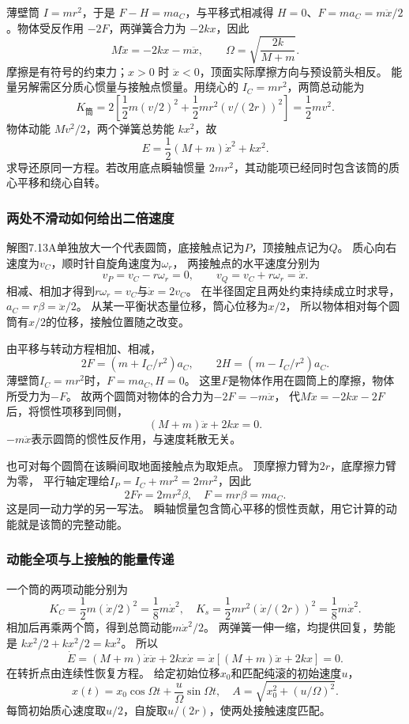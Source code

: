\documentclass[UTF8,fontset=fandol,a4paper,11pt]{ctexart}
\begin{document}
薄壁筒 $I=mr^2$，于是 $F-H=ma_C$，与平移式相减得 $H=0$、$F=ma_C=m\ddot x/2$。物体受反作用 $-2F$，两弹簧合力为 $-2kx$，因此
\[M\ddot x=-2kx-m\ddot x,\qquad
\boxed{\Omega=\sqrt{\frac{2k}{M+m}}.}\]
摩擦是有符号的约束力；$x>0$ 时 $\ddot x<0$，顶面实际摩擦方向与预设箭头相反。
能量另解需区分质心惯量与接触点惯量。用绕心的 $I_C=mr^2$，两筒总动能为
\[K_{
\text{筒}}=2\left[\frac12m(v/2)^2+\frac12mr^2(v/(2r))^2\right]
=\frac12mv^2.\]
物体动能 $Mv^2/2$，两个弹簧总势能 $kx^2$，故
\[E=\frac12(M+m)\dot x^2+kx^2.\]
求导还原同一方程。若改用底点瞬轴惯量 $2mr^2$，其动能项已经同时包含该筒的质心平移和绕心自转。
\subsubsection*{两处不滑动如何给出二倍速度}
解图7.13A单独放大一个代表圆筒，底接触点记为$P$，顶接触点记为$Q$。
质心向右速度为$v_C$，顺时针自旋角速度为$\omega_r$，
两接触点的水平速度分别为
\[
v_P=v_C-r\omega_r=0,\qquad
v_Q=v_C+r\omega_r=\dot x.
\]
相减、相加才得到$r\omega_r=v_C$与$\dot x=2v_C$。
在半径固定且两处约束持续成立时求导，
$a_C=r\beta=\ddot x/2$。
从某一平衡状态量位移，筒心位移为$x/2$，
所以物体相对每个圆筒有$x/2$的位移，接触位置随之改变。

由平移与转动方程相加、相减，
\[
2F=(m+I_C/r^2)a_C,\qquad
2H=(m-I_C/r^2)a_C.
\]
薄壁筒$I_C=mr^2$时，$F=ma_C,H=0$。
这里$F$是物体作用在圆筒上的摩擦，物体所受力为$-F$。
故两个圆筒对物体的合力为$-2F=-m\ddot x$，
代$M\ddot x=-2kx-2F$后，将惯性项移到同侧，
\[
(M+m)\ddot x+2kx=0.
\]
$-m\ddot x$表示圆筒的惯性反作用，与速度耗散无关。

也可对每个圆筒在该瞬间取地面接触点为取矩点。
顶摩擦力臂为$2r$，底摩擦力臂为零，
平行轴定理给$I_P=I_C+mr^2=2mr^2$，因此
\[
2Fr=2mr^2\beta,\quad F=mr\beta=ma_C.
\]
这是同一动力学的另一写法。
瞬轴惯量包含筒心平移的惯性贡献，用它计算的动能就是该筒的完整动能。

\subsubsection*{动能全项与上接触的能量传递}
一个筒的两项动能分别为
\[
K_{C}=\frac12m(\dot x/2)^2=\frac18m\dot x^2,
\quad K_{s}=\frac12mr^2(\dot x/(2r))^2=\frac18m\dot x^2.
\]
相加后再乘两个筒，得到总筒动能$m\dot x^2/2$。
两弹簧一伸一缩，均提供回复，势能是
$kx^2/2+kx^2/2=kx^2$。
所以
\[
\dot E=(M+m)\dot x\ddot x+2kx\dot x
=\dot x[(M+m)\ddot x+2kx]=0.
\]
在转折点由连续性恢复方程。
给定初始位移$x_0$和匹配纯滚的初始速度$u$，
\[
x(t)=x_0\cos\Omega t+\frac u\Omega\sin\Omega t,
\quad A=\sqrt{x_0^2+(u/\Omega)^2}.
\]
每筒初始质心速度取$u/2$，自旋取$u/(2r)$，使两处接触速度匹配。
\end{document}
